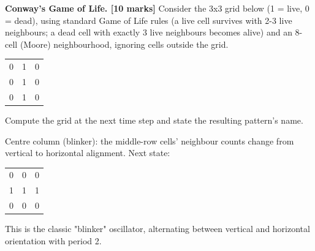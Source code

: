 \documentclass[11pt,addpoints]{exam}
\begin{document}
\begin{questions}
\question
\textbf{Conway's Game of Life. [10 marks]} Consider the 3x3 grid below (1 = live,
0 = dead), using standard Game of Life rules (a live cell survives with 2-3 live
neighbours; a dead cell with exactly 3 live neighbours becomes alive) and an
8-cell (Moore) neighbourhood, ignoring cells outside the grid.
\begin{center}
  \begin{tabular}{ccc}
    \toprule
    0 & 1 & 0 \\
    0 & 1 & 0 \\
    0 & 1 & 0 \\
    \bottomrule
  \end{tabular}
\end{center}
Compute the grid at the next time step and state the resulting pattern's name.
\begin{solution}
  Centre column (blinker): the middle-row cells' neighbour counts change from
  vertical to horizontal alignment. Next state:
  \begin{center}
    \begin{tabular}{ccc}
      \toprule
      0 & 0 & 0 \\
      1 & 1 & 1 \\
      0 & 0 & 0 \\
      \bottomrule
    \end{tabular}
  \end{center}
  This is the classic "blinker" oscillator, alternating between vertical and
  horizontal orientation with period 2.
\end{solution}

\end{questions}
\end{document}
